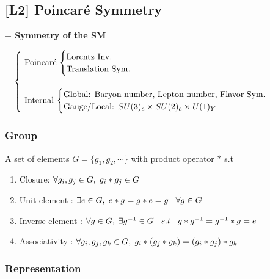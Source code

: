 \documentclass[11pt,letterpaper]{article}
\begin{document}
\newpage

\subsection{[L2] Poincar\'{e} Symmetry}

\VS

{\bfseries $-$ Symmetry of the SM}

\vs

$ \quad
\begin{cases}
	\text{
		Poincar\'{e} $
		\begin{cases}
			\text{Lorentz Inv.} \\
			\text{Translation Sym.}		
		\end{cases}
	$
	} \\
	\\
	\text{
		Internal $
		\begin{cases}
			\text{Global: Baryon number, Lepton number, Flavor Sym.} \\
			\text{Gauge/Local: $SU(3)_c\times SU(2)_c\times U(1)_Y$}		
		\end{cases}
	$
	}
\end{cases}
$

\VS\VS

\subsubsection{Group}

\vs

\begin{definition}[Group]
	A set of elements $G=\{g_1, g_2, \cdots\} $ with product operator $*$ s.t
	\begin{enumerate}
		\item Closure: $\forall g_i, g_j \in G,\hspace{0.1cm} g_i*g_j\in G$
		\item Unit element : $\exists e\in G, \hspace{0.1cm} e*g = g*e = g \hspace{0.3cm} \forall g\in G$
		\item Inverse element : $\forall g\in G, \hspace{0.1cm} \exists g^{-1} \in G \hspace{0.3cm} s.t \hspace{0.3cm} g*g^{-1} = g^{-1}*g = e$
		\item Associativity : $\forall g_i, g_j, g_k \in G, \hspace{0.1cm} g_i*(g_j*g_k) = (g_i * g_j)*g_k$
	\end{enumerate}
\end{definition}

\VS\VS

\subsubsection{Representation}
\end{document}
